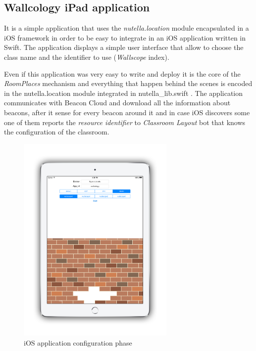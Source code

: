\subsection{Wallcology iPad application}
It is a simple application that uses the \textit{nutella.location} module encapsulated in a iOS framework in order to be easy to integrate in an iOS application written in Swift. The application displays a simple user interface that allow to choose the class name and the identifier to use (\textit{Wallscope} index).

Even if this application was very easy to write and deploy it is the core of the \textit{RoomPlaces} mechanism and everything that happen behind the scenes is encoded in the nutella.location module integrated in nutella\_lib.swift \cite{nutella_lib_swift}. The application communicates with Beacon Cloud and download all the information about beacons, after it sense for every beacon around it and in case iOS discovers some one of them reports the \textit{resource identifier} to \textit{Classroom Layout} bot that knows the configuration of the classroom.

\begin{figure}
\centering
\includegraphics[width=3in]{images/wallcology-ios.png}
\caption{iOS application configuration phase}
\label{fig:wallcology_ios_config}
\end{figure}

